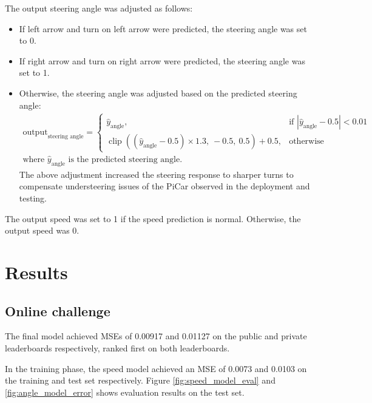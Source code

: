 \documentclass{article}
\begin{document}
The output steering angle was adjusted as follows:
\begin{itemize}
  \item If left arrow and turn on left arrow were predicted, the steering angle was set to 0.
  \item If right arrow and turn on right arrow were predicted, the steering angle was set to 1.
  \item Otherwise, the steering angle was adjusted based on the predicted steering angle:
        \begin{equation}
          \begin{aligned}
            \text{output}_{\text{steering angle}} =
            \begin{cases}
              \hat{y}_{\text{angle}},                                                                    & \text{if } \left| \hat{y}_{\text{angle}} - 0.5 \right| < 0.01 \\
              \operatorname{clip}\left( (\hat{y}_{\text{angle}} - 0.5) \times 1.3,\ -0.5,\ 0.5 \right) + 0.5, & \text{otherwise}
            \end{cases}
            \\
            \text{where } \hat{y}_{\text{angle}} \text{ is the predicted steering angle.}
          \end{aligned}
        \end{equation}
        The above adjustment increased the steering response to sharper turns to compensate understeering issues of the PiCar observed in the deployment and testing.
\end{itemize}
The output speed was set to 1 if the speed prediction is normal. Otherwise, the output speed was 0.


\section{Results}

\subsection{Online challenge}
The final model achieved MSEs of 0.00917 and 0.01127 on the public and private leaderboards respectively, ranked first on both leaderboards.

In the training phase, the speed model achieved an MSE of 0.0073 and 0.0103 on the training and test set respectively. Figure \ref{fig:speed_model_eval} and \ref{fig:angle_model_error} shows evaluation results on the test set.
\end{document}
